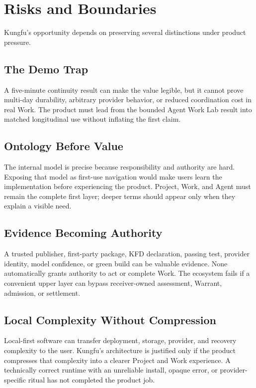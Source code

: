 \section{Risks and Boundaries}

Kungfu's opportunity depends on preserving several distinctions under product
pressure.

\subsection{The Demo Trap}

A five-minute continuity result can make the value legible, but it cannot
prove multi-day durability, arbitrary provider behavior, or reduced
coordination cost in real Work. The product must lead from the bounded Agent
Work Lab result into matched longitudinal use without inflating the first
claim.

\subsection{Ontology Before Value}

The internal model is precise because responsibility and authority are hard.
Exposing that model as first-use navigation would make users learn the
implementation before experiencing the product. Project, Work, and Agent must
remain the complete first layer; deeper terms should appear only when they
explain a visible need.

\subsection{Evidence Becoming Authority}

A trusted publisher, first-party package, KFD declaration, passing test,
provider identity, model confidence, or green build can be valuable evidence.
None automatically grants authority to act or complete Work. The ecosystem
fails if a convenient upper layer can bypass receiver-owned assessment,
Warrant, admission, or settlement.

\subsection{Local Complexity Without Compression}

Local-first software can transfer deployment, storage, provider, and recovery
complexity to the user. Kungfu's architecture is justified only if the product
compresses that complexity into a clearer Project and Work experience. A
technically correct runtime with an unreliable install, opaque error, or
provider-specific ritual has not completed the product job.

